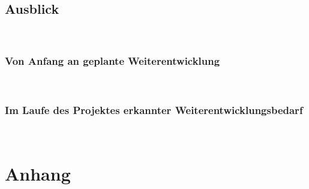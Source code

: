 \documentclass[11pt,toc=sectionentrywithoutdots, 
headheight=44pt, headings=optiontoheadandtoc, hyperfootnotes=false, hypertexnames=false]{scrartcl}
\begin{document}
\subsection{Ausblick}
\blindtext\

\subsubsection{Von Anfang an geplante Weiterentwicklung}
\blindtext\

\subsubsection{Im Laufe des Projektes erkannter Weiterentwicklungsbedarf}
\blindtext\


\newpage
\setcounter{secnumdepth}{0}

{}

\printbibliography




\newpage


\setcounter{page}{1}
\setcounter{secnumdepth}{2}


\renewcommand{\thesection}{A}
\setcounter{section}{1}



\ofoot{\thepage}




\FloatBarrier
\section{Anhang}
\end{document}

